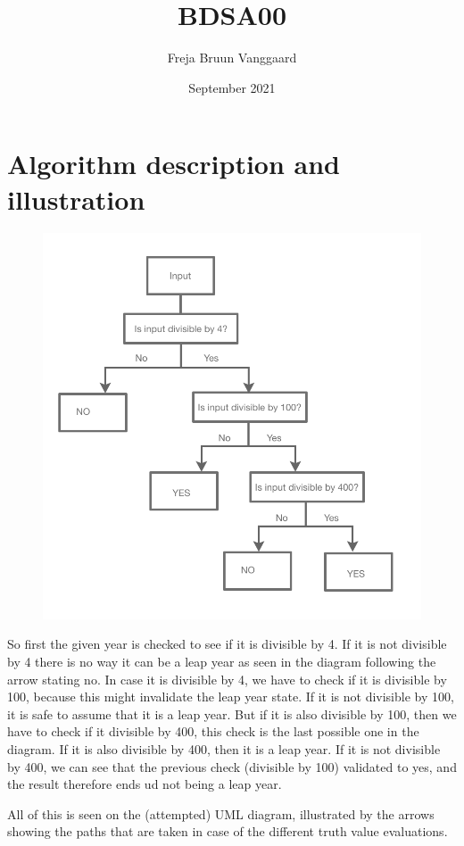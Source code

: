 \documentclass{article}
\title{BDSA00}
\author{Freja Bruun Vanggaard}
\date{September 2021}
\begin{document}
\maketitle

\section{Algorithm description and illustration}

\begin{figure}[h!]
\centering
\includegraphics[scale=0.325]{UML1.png}
\end{figure}

So first the given year is checked to see if it is divisible by 4. If it is not divisible by 4 there is no way it can be a leap year as seen in the diagram following the arrow stating no. In case it is divisible by 4, we have to check if it is divisible by 100, because this might invalidate the leap year state. If it is not divisible by 100, it is safe to assume that it is a leap year. But if it is also divisible by 100, then we have to check if it divisible by 400, this check is the last possible one in the diagram. If it is also divisible by 400, then it is a leap year. If it is not divisible by 400, we can see that the previous check (divisible by 100) validated to yes, and the result therefore ends ud not being a leap year.

All of this is seen on the (attempted) UML diagram, illustrated by the arrows showing the paths that are taken in case of the different truth value evaluations. 
\end{document}
